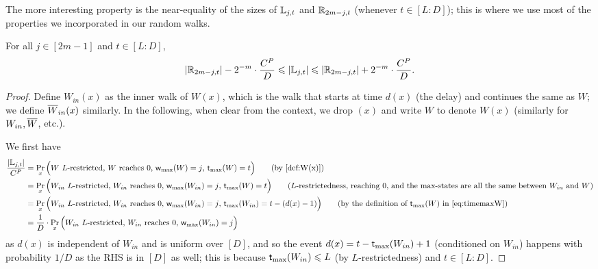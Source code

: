The more interesting property is the near-equality of the sizes of $\mathbb{L}_{j,t}$ and $\mathbb{R}_{2m-j,t}$ (whenever $t \in [L:D]$); this is where we use most of the properties we incorporated in our random walks. 
\begin{lemma}\label{lem:bjt-reflect}
	For all $j \in [2m-1]$ and $t \in [L:D]$, 
	\[
	\left\vert{\mathbb{R}_{2m-j,t}}\right\vert - 2^{-m} \cdot \frac{C^P}{D} \leqslant \left\vert{\mathbb{L}_{j,t}}\right\vert \leqslant \left\vert{\mathbb{R}_{2m-j,t}}\right\vert + 2^{-m} \cdot \frac{C^P}{D}. 
	\]
\end{lemma}
\begin{proof}
	Define $W_{in}(x)$ as the inner walk of $W(x)$, which is the walk that starts at time $d(x)$ (the delay) and continues the same as $W$; we define $\overline{W}_{in}(x)$ similarly. 
	In the following, when clear from the context, we drop $(x)$ and write $W$ to denote $W(x)$ (similarly for $W_{in},\overline{W}$, etc.). 
	
	We first have 
	\begin{align*}
		\frac{\card{\bL_{j,t}}}{C^P} &= \Pr_{x}\Paren{\text{$W$ $L$-restricted, $W$ reaches $0$, $\maxwalk{W}=j$, $\timemax{W} = t$}} \tag{by~\Cref{def:W(x)}}\\
		&=  \Pr_{x}\Paren{\text{$W_{in}$ $L$-restricted, $W_{in}$ reaches $0$, $\maxwalk{W_{in}}=j$,  $\timemax{W} = t$}} \tag{$L$-restrictedness, reaching $0$, and the max-states are all the same 
		between $W_{in}$ and $W$}  \\
		&= \Pr_{x}\Paren{\text{$W_{in}$ $L$-restricted, $W_{in}$ reaches $0$, $\maxwalk{W_{in}}=j$, $\timemax{W_{in}} = t-(d(x)-1)$}} \tag{by the definition of $\timemax{W}$ in~\Cref{eq:timemaxW}} \\
		&= \frac1D \cdot \Pr_{x}\Paren{\text{$W_{in}$ $L$-restricted, $W_{in}$ reaches $0$, $\maxwalk{W_{in}}=j$}} 
	\end{align*}
	as $d(x)$ is independent of $W_{in}$ and is uniform over $[D]$, 
	and so the event $d(x) = t-\textnormal{\textsf{t}}_{\textnormal{max}}(W_{in})+1$ (conditioned on $W_{in}$) happens with probability $1/D$ as the RHS is in $[D]$ as well; this is because $\textnormal{\textsf{t}}_{\textnormal{max}}(W_{in}) \leqslant L$ (by $L$-restrictedness) and $t \in [L:D]$. 
	

\end{proof}
